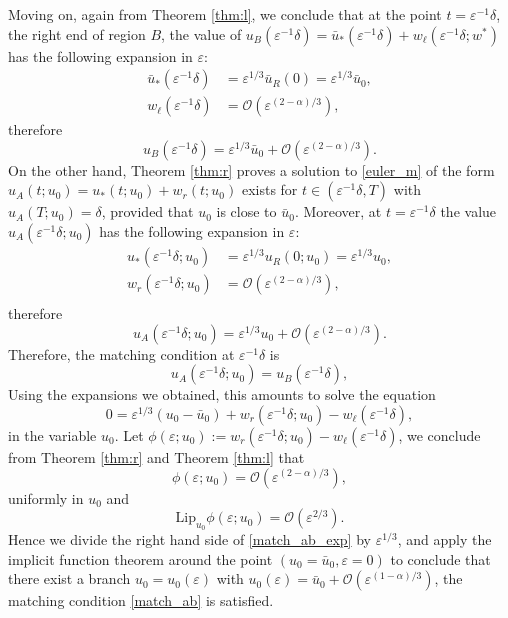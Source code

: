 \documentclass[letterpaper,11pt]{article}
\newcommand{\rmO}{\mathcal{O}}
\newcommand{\eps}{\varepsilon}
\numberwithin{equation}{section}
\theoremstyle{plain}
\begin{document}
Moving on, again from Theorem \ref{thm:l}, we conclude that at the point $t=\eps^{-1}\delta$, the right end of region $B$, the value of $u_B(\eps^{-1}\delta) = \bar{u}_*(\eps^{-1}\delta)  + w_\ell(\eps^{-1}\delta; w^*)$ has the following expansion in $\eps$:
\begin{align*}
\bar{u}_*(\eps^{-1}\delta) &= \eps^{1/3}\bar{u}_R(0) = \eps^{1/3}\bar{u}_0, \\
w_\ell(\eps^{-1}\delta) &=  \rmO(\eps^{(2-\alpha)/3}), 
\end{align*}
therefore
\[
u_B(\eps^{-1}\delta) = \eps^{1/3} \bar{u}_0+\rmO(\eps^{(2-\alpha)/3}).
\]
On the other hand, Theorem \ref{thm:r} proves a solution to \eqref{euler_m} of the form $u_A(t;u_0) = u_*(t; u_0) + w_r(t; u_0)$ exists for $ t \in (\eps^{-1}\delta, T)$ with $u_A(T;u_0) = \delta$, provided that $u_0$ is close to $\bar{u}_0$. Moreover, at $t=\eps^{-1}\delta$ the value $u_A(\eps^{-1}\delta; u_0)$ has the following expansion in $\eps$:
\begin{align*}
u_*(\eps^{-1}\delta; u_0) &= \eps^{1/3}u_R(0;u_0) =  \eps^{1/3}u_0,\\
w_r(\eps^{-1}\delta ; u_0) &= \rmO(\eps^{(2-\alpha)/3}),\\
\end{align*}
therefore
\[
u_A(\eps^{-1}\delta; u_0 ) = \eps^{1/3}u_0 + \rmO(\eps^{(2-\alpha)/3}).
\]
Therefore, the matching condition at $\eps^{-1}\delta$ is
\begin{equation}\label{match_ab}
u_A(\eps^{-1}\delta; u_0) = u_B(\eps^{-1}\delta),
\end{equation}
Using the expansions we obtained, this amounts to solve the equation
\begin{equation}\label{match_ab_exp}
0= \eps^{1/3}(u_0 - \bar{u}_0) + w_r(\eps^{-1}\delta; u_0)-w_\ell(\eps^{-1}\delta),
\end{equation}
in the variable $u_0$.
Let $\phi(\eps; u_0) :=  w_r(\eps^{-1}\delta; u_0)-w_\ell(\eps^{-1}\delta)$, we conclude from Theorem \ref{thm:r} and Theorem \ref{thm:l} that
\[
\phi(\eps; u_0) = \rmO(\eps^{(2-\alpha)/3}), 
\]
uniformly in $u_0$ and 
\[
\text{Lip}_{u_0} \phi(\eps; u_0) = \rmO(\eps^{2/3}).
\]
Hence we divide the right hand side of \eqref{match_ab_exp} by $\eps^{1/3}$, and apply the implicit function theorem around the point $(u_0=\bar{u}_0, \eps=0)$ to conclude that there exist a branch $u_0 = u_0(\eps)$ with $u_0(\eps)  = \bar{u}_0 + \rmO(\eps^{(1-\alpha)/3})$, the matching condition \eqref{match_ab} is satisfied. 
\end{document}
